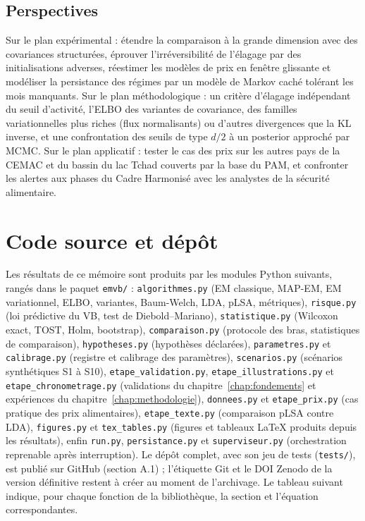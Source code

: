 \section*{Perspectives}
Sur le plan expérimental : étendre la comparaison à la grande dimension avec des covariances structurées, éprouver l'irréversibilité de l'élagage par des initialisations adverses, réestimer les modèles de prix en fenêtre glissante et modéliser la persistance des régimes par un modèle de Markov caché tolérant les mois manquants. Sur le plan méthodologique : un critère d'élagage indépendant du seuil d'activité, l'ELBO des variantes de covariance, des familles variationnelles plus riches (flux normalisants) ou d'autres divergences que la KL inverse, et une confrontation des seuils de type $d/2$ à un posterior approché par MCMC. Sur le plan applicatif : tester le cas des prix sur les autres pays de la CEMAC et du bassin du lac Tchad couverts par la base du PAM, et confronter les alertes aux phases du Cadre Harmonisé avec les analystes de la sécurité alimentaire.

\appendix
\chapter{Code source et dépôt}\label{ann:code}
Les résultats de ce mémoire sont produits par les modules Python suivants, rangés dans le paquet \texttt{emvb/} : \texttt{algorithmes.py} (EM classique, MAP-EM, EM variationnel, ELBO, variantes, Baum-Welch, LDA, pLSA, métriques), \texttt{risque.py} (loi prédictive du VB, test de Diebold--Mariano), \texttt{statistique.py} (Wilcoxon exact, TOST, Holm, bootstrap), \texttt{comparaison.py} (protocole des bras, statistiques de comparaison), \texttt{hypotheses.py} (hypothèses déclarées), \texttt{parametres.py} et \texttt{calibrage.py} (registre et calibrage des paramètres), \texttt{scenarios.py} (scénarios synthétiques S1 à S10), \texttt{etape\_validation.py}, \texttt{etape\_illustrations.py} et \texttt{etape\_chronometrage.py} (validations du chapitre~\ref{chap:fondements} et expériences du chapitre~\ref{chap:methodologie}), \texttt{donnees.py} et \texttt{etape\_prix.py} (cas pratique des prix alimentaires), \texttt{etape\_texte.py} (comparaison pLSA contre LDA), \texttt{figures.py} et \texttt{tex\_tables.py} (figures et tableaux \LaTeX{} produits depuis les résultats), enfin \texttt{run.py}, \texttt{persistance.py} et \texttt{superviseur.py} (orchestration reprenable après interruption). Le dépôt complet, avec son jeu de tests (\texttt{tests/}), est publié sur GitHub (section A.1) ; l'étiquette Git et le DOI Zenodo de la version définitive restent à créer au moment de l'archivage. Le tableau suivant indique, pour chaque fonction de la bibliothèque, la section et l'équation correspondantes.

